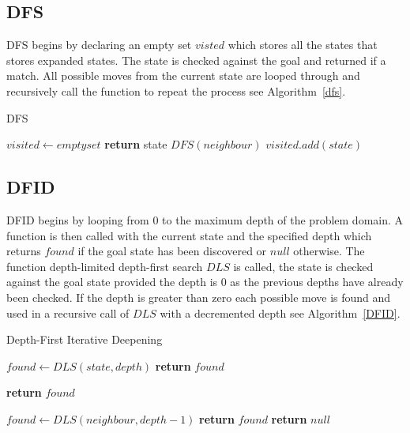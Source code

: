 \documentclass[final]{cmpreport}
\begin{document}
\subsection{DFS}

DFS begins by declaring an empty set $visted$ which stores all the states that stores expanded states. The state is checked against the goal and returned if a match. All possible moves from the current state are looped through and recursively call the function to repeat the process see Algorithm~\ref{dfs}.
\begin{algorithm}
	\caption{DFS}\label{dfs}
	\begin{algorithmic}[1]
		\State $visited \gets empty set$
		\State \textbf{return} state
		\EndIf
		\State	$DFS(neighbour)$
		\EndIf
		\EndFor
		\State $visited.add(state)$
		\EndProcedure
	\end{algorithmic}
\end{algorithm}


\subsection{DFID}

DFID begins by looping from 0 to the maximum depth of the problem domain. A function is then called with the current state and the specified depth which returns $found$ if the goal state has been discovered or $null$ otherwise. The function depth-limited depth-first search $DLS$ is called, the state is checked against the goal state provided the depth is 0 as the previous depths have already been checked. If the depth is greater than zero each possible move is found and used in a recursive call of $DLS$ with a decremented depth see Algorithm~\ref{DFID}. 


\begin{algorithm}
	\caption{Depth-First Iterative Deepening}\label{DFID}
	\begin{algorithmic}[1]
		\State$ found \gets DLS(state, depth)$
		\State \textbf{return} $found$
		\EndIf
		\EndFor
		\EndProcedure
		
		\State \textbf{return} $found$
		\EndIf
		
		\State $found \gets DLS(neighbour, depth-1)$
		\State \textbf{return} $found$
		\EndIf
		\EndFor
		\EndIf 
		\State \textbf{return} $null$
		\EndProcedure
	\end{algorithmic}	
\end{algorithm}	
\end{document}
